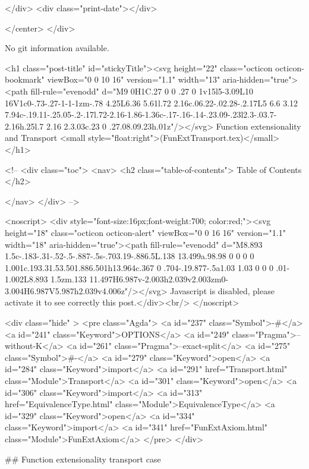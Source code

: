           
        </div>
        <div class="print-date"></div>
        
        
    </center>
  </div>

  
  No git information available.
  

  <h1 class="post-title" id="stickyTitle"><svg height="22" class="octicon octicon-bookmark" viewBox="0 0 10 16" version="1.1" width="13" aria-hidden="true"><path fill-rule="evenodd" d="M9 0H1C.27 0 0 .27 0 1v15l5-3.09L10 16V1c0-.73-.27-1-1-1zm-.78 4.25L6.36 5.61l.72 2.16c.06.22-.02.28-.2.17L5 6.6 3.12 7.94c-.19.11-.25.05-.2-.17l.72-2.16-1.86-1.36c-.17-.16-.14-.23.09-.23l2.3-.03.7-2.16h.25l.7 2.16 2.3.03c.23 0 .27.08.09.23h.01z"/></svg> Function extensionality and Transport <small style="float:right">(FunExtTransport.tex)</small>
  </h1>

  <!-- 
  <div class="toc">
    <nav>
    <h2 class="table-of-contents"> Table of Contents </h2>
      

    </nav>
  </div>
   -->

  <noscript>
  <div style="font-size:16px;font-weight:700; color:red;"><svg height="18" class="octicon octicon-alert" viewBox="0 0 16 16" version="1.1" width="18" aria-hidden="true"><path fill-rule="evenodd" d="M8.893 1.5c-.183-.31-.52-.5-.887-.5s-.703.19-.886.5L.138 13.499a.98.98 0 0 0 0 1.001c.193.31.53.501.886.501h13.964c.367 0 .704-.19.877-.5a1.03 1.03 0 0 0 .01-1.002L8.893 1.5zm.133 11.497H6.987v-2.003h2.039v2.003zm0-3.004H6.987V5.987h2.039v4.006z"/></svg> Javascript is disabled, please activate it to see correctly this post.</div><br/>
  </noscript>

  <div class="hide" >
<pre class="Agda">
<a id="237" class="Symbol">{-#</a> <a id="241" class="Keyword">OPTIONS</a> <a id="249" class="Pragma">--without-K</a> <a id="261" class="Pragma">--exact-split</a> <a id="275" class="Symbol">#-}</a>
<a id="279" class="Keyword">open</a> <a id="284" class="Keyword">import</a> <a id="291" href="Transport.html" class="Module">Transport</a>
<a id="301" class="Keyword">open</a> <a id="306" class="Keyword">import</a> <a id="313" href="EquivalenceType.html" class="Module">EquivalenceType</a>
<a id="329" class="Keyword">open</a> <a id="334" class="Keyword">import</a> <a id="341" href="FunExtAxiom.html" class="Module">FunExtAxiom</a>
</pre>
</div>

## Function extensionality transport case

